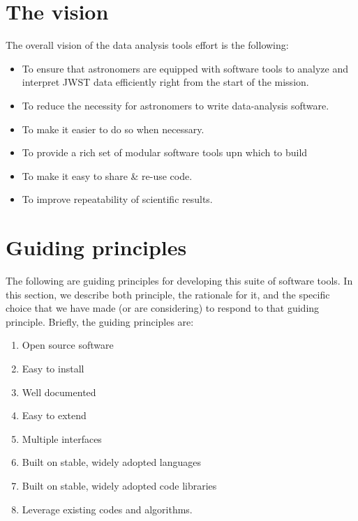 \documentclass[letterpaper,10pt,english]{sphinxmanual}
\begin{document}
\chapter{The vision}
\label{intro:the-vision}\label{intro::doc}
The overall vision of the data analysis tools effort is the following:
\begin{itemize}
\item {} 
To ensure that astronomers are equipped with software tools to analyze and interpret JWST data efficiently right from the start of the mission.

\item {} 
To reduce the necessity for astronomers to write data-analysis software.

\item {} 
To make it easier to do so when necessary.

\item {} 
To provide a rich set of modular software tools upn which to build

\item {} 
To make it easy to share \& re-use code.

\item {} 
To improve repeatability of scientific results.

\end{itemize}


\chapter{Guiding principles}
\label{intro:guiding-principles}
The following are guiding principles for developing this suite of software tools.
In this section, we describe both principle, the rationale for it, and the specific
choice that we have made (or are considering) to respond to that guiding principle.
Briefly, the guiding principles are:
\begin{enumerate}
\item {} 
Open source software

\item {} 
Easy to install

\item {} 
Well documented

\item {} 
Easy to extend

\item {} 
Multiple interfaces

\item {} 
Built on stable, widely adopted languages

\item {} 
Built on stable, widely adopted code libraries

\item {} 
Leverage existing codes and algorithms.

\end{enumerate}
\end{document}

